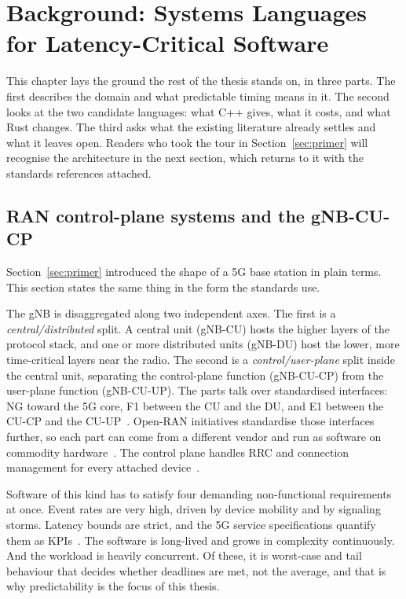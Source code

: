 \documentclass[english,twoside,openright,a4paper,censored,csm,software-track-2020]{HYthesisML}
\begin{document}
\chapter{Background: Systems Languages for Latency-Critical Software\label{chapter:background}}

This chapter lays the ground the rest of the thesis stands on, in three parts. The first
describes the domain and what predictable timing means in it. The second looks at the two
candidate languages: what C++ gives, what it costs, and what Rust changes. The third asks what
the existing literature already settles and what it leaves open. Readers who took the tour in
Section~\ref{sec:primer} will recognise the architecture in the next section, which returns to
it with the standards references attached.

\section{RAN control-plane systems and the gNB-CU-CP}
Section~\ref{sec:primer} introduced the shape of a 5G base station in plain terms. This section
states the same thing in the form the standards use.

The gNB is disaggregated along two independent axes. The first is a \emph{central/distributed}
split. A central unit (gNB-CU) hosts the higher layers of the protocol stack, and one or more
distributed units (gNB-DU) host the lower, more time-critical layers near the radio. The second
is a \emph{control/user-plane} split inside the central unit, separating the control-plane
function (gNB-CU-CP) from the user-plane function (gNB-CU-UP). The parts talk over standardised
interfaces: NG toward the 5G core, F1 between the CU and the DU, and E1 between the CU-CP and
the CU-UP~\cite{3gpp38401,3gpp38300,3gpp38463}. Open-RAN initiatives standardise those
interfaces further, so each part can come from a different vendor and run as software on
commodity hardware~\cite{polese2023oran}. The control plane handles RRC and connection
management for every attached device~\cite{3gpp38401,3gpp38300,3gpp38331}.

Software of this kind has to satisfy four demanding non-functional requirements at once. Event
rates are very high, driven by device mobility and by signaling storms. Latency bounds are
strict, and the 5G service specifications quantify them as KPIs~\cite{3gpp22261}. The software
is long-lived and grows in complexity continuously. And the workload is heavily concurrent. Of
these, it is worst-case and tail behaviour that decides whether deadlines are met, not the
average, and that is why predictability is the focus of this thesis.
\end{document}
